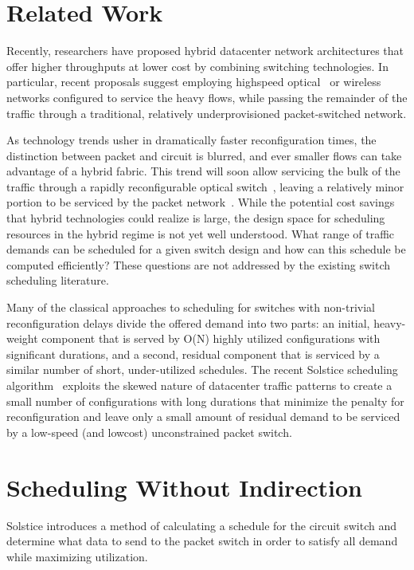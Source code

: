 \section{Related Work}
\label{sec:related}
Recently, researchers have proposed hybrid datacenter network architectures
that offer higher throughputs at lower cost by combining switching
technologies. In particular, recent proposals suggest employing
highspeed optical~\cite{Chen:2012, Farrington:2010, Wang:2010} or
wireless~\cite{Halperin:2011, Kandula:2009, Zhou:2012} networks
configured to service the heavy flows, while passing the remainder of
the traffic through a traditional, relatively underprovisioned
packet-switched network. 

As technology trends usher in dramatically faster reconfiguration times,
the distinction between packet and circuit is blurred, and ever smaller
flows can take advantage of a hybrid fabric. This trend will soon allow
servicing the bulk of the traffic through a rapidly reconfigurable
optical switch~\cite{Porter:2013}, leaving a relatively minor portion to
be serviced by the packet network~\cite{Liu:2014}. While the potential
cost savings that hybrid technologies could realize is large, the design
space for scheduling resources in the hybrid regime is not yet well
understood. What range of traffic demands can be scheduled for a given
switch design and how can this schedule be computed efficiently? These
questions are not addressed by the existing switch scheduling literature.

Many of the classical approaches to scheduling for switches with
non-trivial reconfiguration delays divide the offered demand into two
parts: an initial, heavy-weight component that is served by O(N) highly
utilized configurations with significant durations, and a second,
residual component that is serviced by a similar number of short,
under-utilized schedules. The recent Solstice scheduling algorithm~\cite{Liu:2015}
exploits the skewed nature of datacenter traffic
patterns to create a small number of configurations with long durations
that minimize the penalty for reconfiguration and leave only a small
amount of residual demand to be serviced by a low-speed (and lowcost)
unconstrained packet switch.

\section{Scheduling Without Indirection}
\label{sec:noindirection}
Solstice introduces a method of calculating a schedule for the circuit switch
and determine what data to send to the packet switch in order to satisfy all
demand while maximizing utilization.


